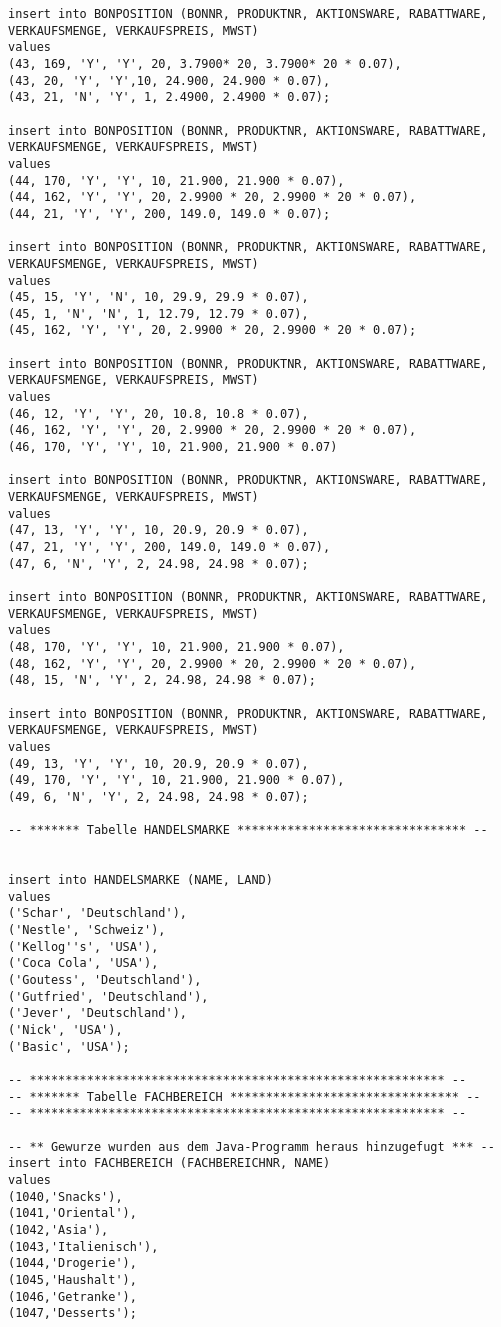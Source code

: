 \begin{lstlisting}
insert into BONPOSITION (BONNR, PRODUKTNR, AKTIONSWARE, RABATTWARE, VERKAUFSMENGE, VERKAUFSPREIS, MWST)
values
(43, 169, 'Y', 'Y', 20, 3.7900* 20, 3.7900* 20 * 0.07),
(43, 20, 'Y', 'Y',10, 24.900, 24.900 * 0.07),
(43, 21, 'N', 'Y', 1, 2.4900, 2.4900 * 0.07);

insert into BONPOSITION (BONNR, PRODUKTNR, AKTIONSWARE, RABATTWARE, VERKAUFSMENGE, VERKAUFSPREIS, MWST)
values
(44, 170, 'Y', 'Y', 10, 21.900, 21.900 * 0.07),
(44, 162, 'Y', 'Y', 20, 2.9900 * 20, 2.9900 * 20 * 0.07),
(44, 21, 'Y', 'Y', 200, 149.0, 149.0 * 0.07);

insert into BONPOSITION (BONNR, PRODUKTNR, AKTIONSWARE, RABATTWARE, VERKAUFSMENGE, VERKAUFSPREIS, MWST)
values
(45, 15, 'Y', 'N', 10, 29.9, 29.9 * 0.07),
(45, 1, 'N', 'N', 1, 12.79, 12.79 * 0.07),
(45, 162, 'Y', 'Y', 20, 2.9900 * 20, 2.9900 * 20 * 0.07);

insert into BONPOSITION (BONNR, PRODUKTNR, AKTIONSWARE, RABATTWARE, VERKAUFSMENGE, VERKAUFSPREIS, MWST)
values
(46, 12, 'Y', 'Y', 20, 10.8, 10.8 * 0.07),
(46, 162, 'Y', 'Y', 20, 2.9900 * 20, 2.9900 * 20 * 0.07),
(46, 170, 'Y', 'Y', 10, 21.900, 21.900 * 0.07)

insert into BONPOSITION (BONNR, PRODUKTNR, AKTIONSWARE, RABATTWARE, VERKAUFSMENGE, VERKAUFSPREIS, MWST)
values
(47, 13, 'Y', 'Y', 10, 20.9, 20.9 * 0.07),
(47, 21, 'Y', 'Y', 200, 149.0, 149.0 * 0.07),
(47, 6, 'N', 'Y', 2, 24.98, 24.98 * 0.07);

insert into BONPOSITION (BONNR, PRODUKTNR, AKTIONSWARE, RABATTWARE, VERKAUFSMENGE, VERKAUFSPREIS, MWST)
values
(48, 170, 'Y', 'Y', 10, 21.900, 21.900 * 0.07),
(48, 162, 'Y', 'Y', 20, 2.9900 * 20, 2.9900 * 20 * 0.07),
(48, 15, 'N', 'Y', 2, 24.98, 24.98 * 0.07);

insert into BONPOSITION (BONNR, PRODUKTNR, AKTIONSWARE, RABATTWARE, VERKAUFSMENGE, VERKAUFSPREIS, MWST)
values
(49, 13, 'Y', 'Y', 10, 20.9, 20.9 * 0.07),
(49, 170, 'Y', 'Y', 10, 21.900, 21.900 * 0.07),
(49, 6, 'N', 'Y', 2, 24.98, 24.98 * 0.07);

-- ******* Tabelle HANDELSMARKE ******************************** --


insert into HANDELSMARKE (NAME, LAND)
values
('Schar', 'Deutschland'),
('Nestle', 'Schweiz'),
('Kellog''s', 'USA'),
('Coca Cola', 'USA'),
('Goutess', 'Deutschland'),
('Gutfried', 'Deutschland'),
('Jever', 'Deutschland'),
('Nick', 'USA'),
('Basic', 'USA');

-- ********************************************************** --
-- ******* Tabelle FACHBEREICH ******************************** --
-- ********************************************************** --

-- ** Gewurze wurden aus dem Java-Programm heraus hinzugefugt *** --
insert into FACHBEREICH (FACHBEREICHNR, NAME)
values
(1040,'Snacks'),
(1041,'Oriental'),
(1042,'Asia'),
(1043,'Italienisch'),
(1044,'Drogerie'),
(1045,'Haushalt'),
(1046,'Getranke'),
(1047,'Desserts');


\end{lstlisting}



